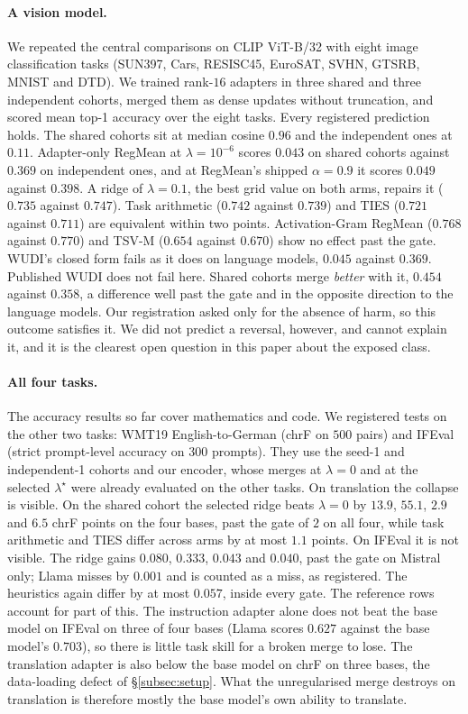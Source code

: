 \paragraph{A vision model.} We repeated the central comparisons on CLIP
ViT-B/32 with eight image classification tasks (SUN397, Cars, RESISC45,
EuroSAT, SVHN, GTSRB, MNIST and DTD). We trained rank-$16$ adapters in three
shared and three independent cohorts, merged them as dense updates without
truncation, and scored mean top-1 accuracy over the eight tasks. Every
registered prediction holds. The shared cohorts sit at median cosine $0.96$
and the independent ones at $0.11$. Adapter-only RegMean at
$\lambda = 10^{-6}$ scores $0.043$ on shared cohorts against $0.369$ on
independent ones, and at RegMean's shipped $\alpha = 0.9$ it scores $0.049$
against $0.398$. A ridge of $\lambda = 0.1$, the best grid value on both arms,
repairs it ($0.735$ against $0.747$). Task arithmetic ($0.742$ against
$0.739$) and TIES ($0.721$ against $0.711$) are equivalent within two points.
Activation-Gram RegMean ($0.768$ against $0.770$) and TSV-M ($0.654$ against
$0.670$) show no effect past the gate. WUDI's closed form fails as it does on
language models, $0.045$ against $0.369$. Published WUDI does not fail here.
Shared cohorts merge \emph{better} with it, $0.454$ against $0.358$, a
difference well past the gate and in the opposite direction to the language
models. Our registration asked only for the absence of harm, so this outcome
satisfies it. We did not predict a reversal, however, and cannot explain it,
and it is the clearest open question in this paper about the exposed class.

\paragraph{All four tasks.} The accuracy results so far cover mathematics and
code. We registered tests on the other two tasks: WMT19 English-to-German
(chrF on $500$ pairs) and IFEval (strict prompt-level accuracy on $300$
prompts). They use the seed-1 and independent-1 cohorts and our encoder, whose
merges at $\lambda = 0$ and at the selected $\lambda^\star$ were already
evaluated on the other tasks. On translation the collapse is visible. On the
shared cohort the selected ridge beats $\lambda = 0$ by $13.9$, $55.1$, $2.9$
and $6.5$ chrF points on the four bases, past the gate of $2$ on all four,
while task arithmetic and TIES differ across arms by at most $1.1$ points. On
IFEval it is not visible. The ridge gains $0.080$, $0.333$, $0.043$ and
$0.040$, past the gate on Mistral only; Llama misses by $0.001$ and is counted
as a miss, as registered. The heuristics again differ by at most $0.057$,
inside every gate. The reference rows account for part of this. The
instruction adapter alone does not beat the base model on IFEval on three of
four bases (Llama scores $0.627$ against the base model's $0.703$), so there
is little task skill for a broken merge to lose. The translation adapter is
also below the base model on chrF on three bases, the data-loading defect of
\S\ref{subsec:setup}. What the unregularised merge destroys on translation is
therefore mostly the base model's own ability to translate.

